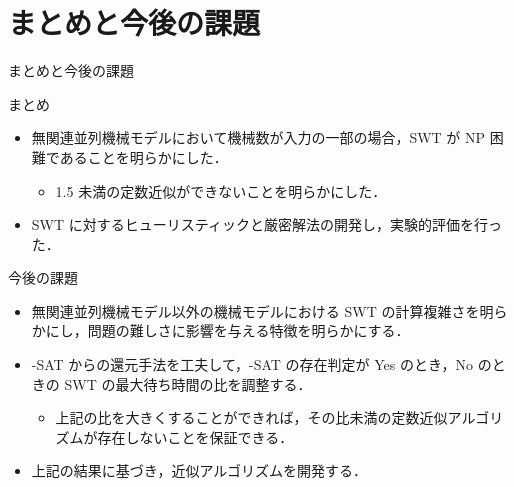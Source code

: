 \documentclass[dvipdfmx]{beamer}
\begin{document}
    \section{まとめと今後の課題}
    \begin{frame}{まとめと今後の課題}
      \begin{block}{まとめ}
        \begin{itemize}
          \item 無関連並列機械モデルにおいて機械数が入力の一部の場合，SWT が NP 困難であることを明らかにした．
          \begin{itemize}
            \item 1.5 未満の定数近似ができないことを明らかにした．
          \end{itemize}
          \item SWT に対するヒューリスティックと厳密解法の開発し，実験的評価を行った．
        \end{itemize}
      \end{block}
      \begin{alertblock}{今後の課題}
        \begin{itemize}
          \item 無関連並列機械モデル以外の機械モデルにおける SWT の計算複雑さを明らかにし，問題の難しさに影響を与える特徴を明らかにする．
          \item {-SAT} からの還元手法を工夫して，{-SAT} の存在判定が Yes のとき，No のときの SWT の最大待ち時間の比を調整する．
          \begin{itemize}
            \item 上記の比を大きくすることができれば，その比未満の定数近似アルゴリズムが存在しないことを保証できる．
          \end{itemize}
          \item 上記の結果に基づき，近似アルゴリズムを開発する．
        \end{itemize}
      \end{alertblock}
    \end{frame}
    \begin{frame}

    \end{frame}
\end{document}

